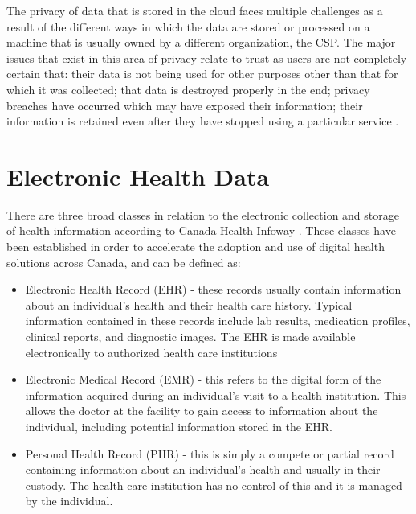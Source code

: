 The privacy of data that is stored in the cloud faces multiple challenges as a result of the different ways in which the data are stored or processed on a machine that is usually owned by a different organization, the CSP. The major issues that exist in this area of privacy relate to trust as users are not completely certain that: their data is not being used for other purposes other than that for which it was collected; that data is destroyed properly in the end; privacy breaches have occurred which may have exposed their information; their information is retained even after they have stopped using a particular service \cite{pearsonprivacy}.

\section{Electronic Health Data}

There are three broad classes in relation to the electronic collection and storage of health information according to Canada Health Infoway \cite{caninfoway}. These classes have been established in order to accelerate the adoption and use of digital health solutions across Canada, and can be defined as:

\begin{itemize}
	
	\item Electronic Health Record (EHR) \cite{caninfoway} - these records usually contain information about an individual's health and their health care history. Typical information contained in these records include lab results, medication profiles, clinical reports, and diagnostic images. The EHR is made available electronically to authorized health care institutions
	
	\item Electronic Medical Record (EMR) \cite{caninfoway} - this refers to the digital form of the information acquired during an individual's visit to a health institution. This allows the doctor at the facility to gain access to information about the individual, including potential information stored in the EHR.
	
	\item Personal Health Record (PHR) \cite{caninfoway} - this is simply a compete or partial record containing information about an individual's health and usually in their custody. The health care institution has no control of this and it is managed by the individual.
	
\end{itemize}

